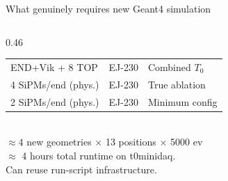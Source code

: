 \documentclass[xcolor=table,aspectratio=169,9pt]{beamer}
\begin{document}
\begin{frame}{What genuinely requires new Geant4 simulation}
\begin{columns}[T]
\begin{column}{0.46\textwidth}
\begin{tabular}{lll}
END+Vik + 8 TOP & EJ-230 & Combined $T_0$\\
4 SiPMs/end (phys.) & EJ-230 & True ablation\\
2 SiPMs/end (phys.) & EJ-230 & Minimum config\\
\bottomrule
\end{tabular}\\[0.4em]
\normalsize
$\approx 4$ new geometries $\times$ 13 positions $\times$ 5000 ev\\
$\approx$ 4 hours total runtime on t0minidaq.\\[0.3em]
Can reuse run-script infrastructure.
\end{column}
\end{columns}
\end{frame}

\end{document}
